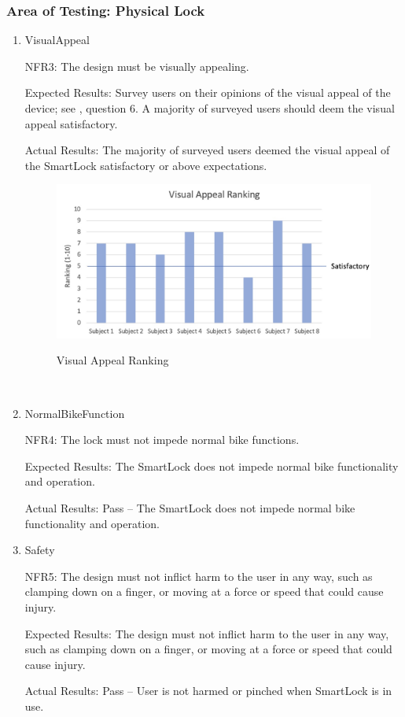 \documentclass[12pt, titlepage]{article}
\begin{document}
\subsubsection{Area of Testing: Physical Lock}
\begin{enumerate}

\item{VisualAppeal

NFR3: The design must be visually appealing.}

Expected Results: Survey users on their opinions of the visual appeal of the device; see , question 6. A majority of surveyed users should deem the visual appeal satisfactory.

Actual Results: The majority of surveyed users deemed the visual appeal of the SmartLock satisfactory or above expectations. 

 \begin{figure}[h!]
 \begin{center}
 {
 \includegraphics[width=0.65\linewidth]{VisualAppealRanking}
 }
 \caption{\label{VisualAppealRanking} Visual Appeal Ranking}
 \end{center}
 \end{figure}

~\newpage
\item{NormalBikeFunction

NFR4: The lock must not impede normal bike functions. }

Expected Results: The SmartLock does not impede normal bike functionality and operation. 

Actual Results: Pass -- The SmartLock does not impede normal bike functionality and operation. 

\item{Safety

NFR5: The design must not inflict harm to the user in any way, such as clamping down on a finger, or moving at a force or speed that could cause injury. }

Expected Results: The design must not inflict harm to the user in any way, such as clamping down on a finger, or moving at a force or speed that could cause injury. 

Actual Results: Pass -- User is not harmed or pinched when SmartLock is in use. 

\end{enumerate}
\end{document}
